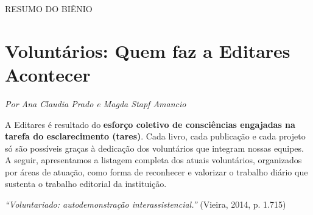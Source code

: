 \documentclass[
]{article}
\begin{document}
RESUMO DO BIÊNIO

\section{Voluntários: Quem faz a Editares Acontecer}\label{voluntuxe1rios-quem-faz-a-editares-acontecer}

\emph{Por Ana Claudia Prado e Magda Stapf Amancio}

A Editares é resultado do \textbf{esforço coletivo de consciências engajadas na tarefa do esclarecimento (tares)}. Cada livro, cada publicação e cada projeto só são possíveis graças à dedicação dos voluntários que integram nossas equipes. A seguir, apresentamos a listagem completa dos atuais voluntários, organizados por áreas de atuação, como forma de reconhecer e valorizar o trabalho diário que sustenta o trabalho editorial da instituição.

\emph{``Voluntariado: autodemonstração interassistencial.''} (Vieira, 2014, p. 1.715)
\end{document}

